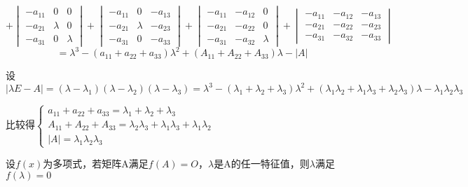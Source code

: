 \[ + \begin{vmatrix}
    -a_{11} & 0 & 0 \\ 
    -a_{21} & \lambda & 0 \\ 
    -a_{31} & 0 & \lambda
\end{vmatrix} + \begin{vmatrix}
    -a_{11} & 0 & -a_{13} \\ 
    -a_{21} & \lambda & -a_{23} \\ 
    -a_{31} & 0 & -a_{33}
\end{vmatrix} + \begin{vmatrix}
    -a_{11} & -a_{12} & 0 \\ 
    -a_{21} & -a_{22} & 0 \\ 
    -a_{31} & -a_{32} & \lambda
\end{vmatrix} + \begin{vmatrix}
    -a_{11} & -a_{12} & -a_{13} \\ 
    -a_{21} & -a_{22} & -a_{23} \\ 
    -a_{31} & -a_{32} & -a_{33}
\end{vmatrix}\]
\[ = \lambda^3 - (a_{11} + a_{22} + a_{33})\lambda^2 + (A_{11} + A_{22} + A_{33})\lambda - |A|\]

设\(|\lambda E - A| = (\lambda - \lambda_1)(\lambda - \lambda_2)(\lambda - \lambda_3) = \lambda^3 - (\lambda_1 + \lambda_2 + \lambda_3)\lambda^2 + (\lambda_1\lambda_2 + \lambda_1\lambda_3 + \lambda_2\lambda_3)\lambda - \lambda_1\lambda_2\lambda_3\)

比较得\(\begin{cases}
    a_{11} + a_{22} + a_{33} = \lambda_1 + \lambda_2 + \lambda_3 \\ 
    A_{11} + A_{22} + A_{33} = \lambda_2\lambda_3 + \lambda_1\lambda_3 + \lambda_1\lambda_2 \\ 
    |A| = \lambda_1\lambda_2\lambda_3
\end{cases}\)

设\(f(x)\)为多项式，若矩阵A满足\(f(A) = O\)，\(\lambda\)是A的任一特征值，则\(\lambda\)满足\(f(\lambda) = 0\)

